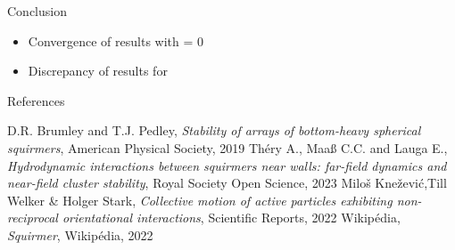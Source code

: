 \documentclass{beamer}
\begin{document}
\begin{frame}{Conclusion}
    \begin{itemize}
        \item Convergence of results with \beta = 0
        \item Discrepancy of results for \beta {}
    \end{itemize}
\end{frame}

\begin{frame}{References}
    \begin{thebibliography}{}
         D.R. Brumley and T.J. Pedley, \emph{Stability of arrays of bottom-heavy spherical squirmers}, American Physical Society, 2019
         Théry A., Maaß C.C. and Lauga E., \emph{Hydrodynamic interactions between squirmers near walls: far-field dynamics and near-field cluster stability}, Royal Society Open Science, 2023
         Miloš Knežević,Till Welker \& Holger Stark, \emph{Collective motion of active particles exhibiting non-reciprocal orientational interactions}, Scientific Reports, 2022
         Wikipédia, \emph{Squirmer}, Wikipédia, 2022
    \end{thebibliography}
\end{frame}
\end{document}
